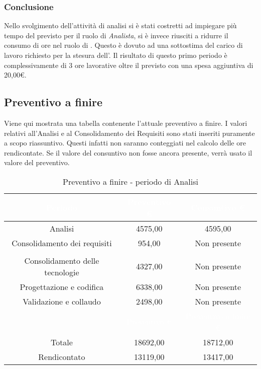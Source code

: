 \subsubsection{Conclusione}
Nello svolgimento dell'attività di analisi si è stati costretti ad impiegare più tempo del previsto per il ruolo di \textit{Analista}, si è invece riusciti a ridurre il consumo di ore nel ruolo di \Amministratore. Questo è dovuto ad una sottostima del carico di lavoro richiesto per la stesura dell'. Il risultato di questo primo periodo è complessivamente di 3 ore lavorative oltre il previsto con una spesa aggiuntiva di 20,00€.
\subsection{Preventivo a finire}
Viene qui mostrata una tabella contenente l'attuale preventivo a finire. I valori relativi all'Analisi e al Consolidamento dei Requisiti sono stati inseriti puramente a scopo riassuntivo. Questi infatti non saranno conteggiati nel calcolo delle ore rendicontate. Se il valore del consuntivo non fosse ancora presente, verrà usato il valore del preventivo.
\begin{table}[H]
	\centering
	\begin{tabular}{|c|c|c|}
	\rowcolor{darkblue} 
		\textcolor{white}{Periodo}	&\textcolor{white}{Preventivo €}	&	\textcolor{white}{Consuntivo €} \\ \hline
		Analisi					&	4575,00				&	4595,00  \\ \hline
		Consolidamento dei requisiti	&	954,00				&	Non presente  \\ \hline
		\rowcolor{darkblue} \multicolumn{3}{|c|}{\textcolor{white}{Rendicontato}}  \\ \hline
		Consolidamento delle tecnologie	&	4327,00				&	Non presente  \\ \hline
		Progettazione e codifica		&	6338,00				&	Non presente  \\ \hline
		Validazione e collaudo		&	2498,00				&	Non presente  \\ \hline
		\rowcolor{darkblue}		&\textcolor{white}{Preventivo €}	&	\textcolor{white}{Preventivo a finire €} \\ \hline
		Totale					&	18692,00				&	18712,00 \\ \hline
		Rendicontato			&	13119,00				&	13417,00 \\ \hline
	\end{tabular}
	\caption{Preventivo a finire - periodo di Analisi}
\end{table}